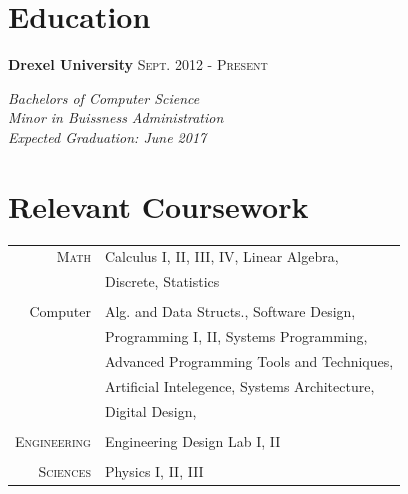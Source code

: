 \documentclass[10pt]{article}
\begin{document}
{\begin{minipage}[t]{0.44\textwidth}

\section{Education} 

\textbf{Drexel University} \hfill \textsc{Sept. 2012 - Present}

\textit{\hspace*{5 mm}Bachelors of Computer Science}\\
\textit{\hspace*{5 mm}Minor in Buissness Administration}\\
\textit{\hspace*{5 mm}Expected Graduation: June 2017}\\



\section{Relevant Coursework} 


\begin{tabular}{rl}
\textsc{Math}
& Calculus I, II, III, IV, Linear Algebra, \\
& Discrete, Statistics\\\\
Computer
& Alg. and Data Structs., Software Design, \\
& Programming I, II, Systems Programming, \\
& Advanced Programming Tools and Techniques, \\
& Artificial Intelegence, Systems Architecture, \\
& Digital Design, \\\\
\textsc{Engineering}
& Engineering Design Lab I, II \\\\
\textsc{Sciences}
& Physics I, II, III
\end{tabular}\\[10pt]




\end{minipage}}
\end{document}
